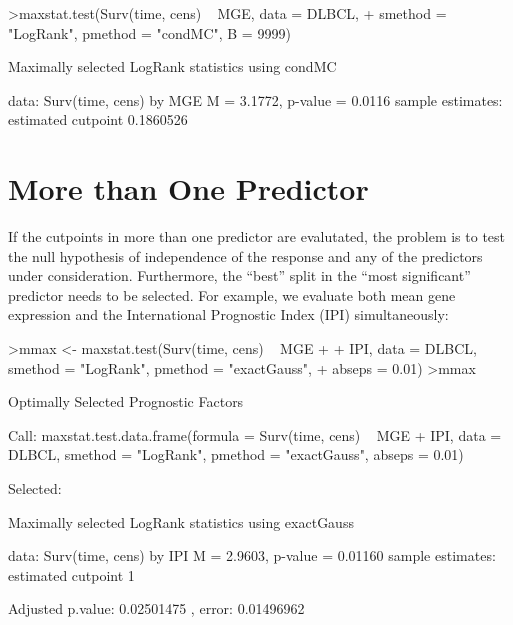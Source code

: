 \documentclass{article}
\renewcommand{\baselinestretch}{1.5}
\begin{document}
\begin{Schunk}
\begin{Sinput}
>maxstat.test(Surv(time, cens) ~ MGE, data = DLBCL, 
+     smethod = "LogRank", pmethod = "condMC", B = 9999)
\end{Sinput}
\begin{Soutput}
	Maximally selected LogRank statistics using condMC

data:  Surv(time, cens) by MGE 
M = 3.1772, p-value = 0.0116
sample estimates:
estimated cutpoint 
         0.1860526 
\end{Soutput}
\end{Schunk}



\section{More than One Predictor}

If the cutpoints in more than one predictor are evalutated, the problem is
to test the null hypothesis of independence of the response and any of the
predictors under consideration. Furthermore, the ``best'' split in the
``most significant'' predictor needs to be selected. For example, we
evaluate both mean gene expression and the International Prognostic Index
(IPI) simultaneously:

\renewcommand{\baselinestretch}{1}
\begin{Schunk}
\begin{Sinput}
>mmax <- maxstat.test(Surv(time, cens) ~ MGE + 
+     IPI, data = DLBCL, smethod = "LogRank", pmethod = "exactGauss", 
+     abseps = 0.01)
>mmax
\end{Sinput}
\begin{Soutput}
	 Optimally Selected Prognostic Factors 

Call: maxstat.test.data.frame(formula = Surv(time, cens) ~ MGE + IPI, 
    data = DLBCL, smethod = "LogRank", pmethod = "exactGauss", 
    abseps = 0.01)


 Selected: 

	Maximally selected LogRank statistics using
	exactGauss

data:  Surv(time, cens) by IPI 
M = 2.9603, p-value = 0.01160
sample estimates:
estimated cutpoint 
                 1 

Adjusted p.value: 
0.02501475 , error:  0.01496962 
\end{Soutput}
\end{Schunk}
\renewcommand{\baselinestretch}{1.5}
\end{document}
